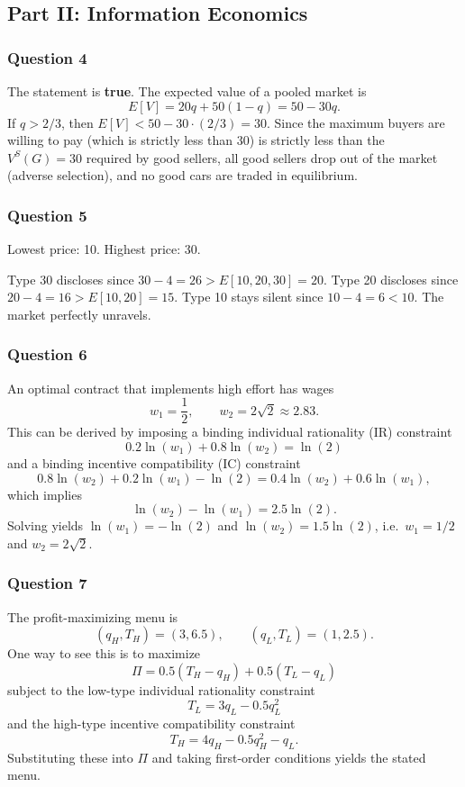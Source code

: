 \documentclass[12pt,a4paper]{article}
\begin{document}
\subsection*{Part II: Information Economics}

\subsubsection*{Question 4}

The statement is \textbf{true}. The expected value of a pooled market is
\[
  E[V] = 20q + 50(1-q) = 50 - 30q.
\]
If \(q > 2/3\), then \(E[V] < 50 - 30 \cdot (2/3) = 30\). Since the maximum buyers are willing to pay (which is strictly less than 30) is strictly less than the \(V^S(G) = 30\) required by good sellers, all good sellers drop out of the market (adverse selection), and no good cars are traded in equilibrium.

\subsubsection*{Question 5}

Lowest price: 10. Highest price: 30.

Type 30 discloses since \(30-4 = 26 > E[10,20,30]=20\). Type 20 discloses since \(20-4 = 16 > E[10,20]=15\). Type 10 stays silent since \(10-4=6 < 10\). The market perfectly unravels.

\subsubsection*{Question 6}

An optimal contract that implements high effort has wages
\[
  w_1 = \frac{1}{2}, \qquad w_2 = 2\sqrt{2} \approx 2.83.
\]
This can be derived by imposing a binding individual rationality (IR) constraint
\[
  0.2\ln(w_1) + 0.8\ln(w_2) = \ln(2)
\]
and a binding incentive compatibility (IC) constraint
\[
  0.8\ln(w_2) + 0.2\ln(w_1) - \ln(2)
  = 0.4\ln(w_2) + 0.6\ln(w_1),
\]
which implies
\[
  \ln(w_2) - \ln(w_1) = 2.5\ln(2).
\]
Solving yields \(\ln(w_1) = -\ln(2)\) and \(\ln(w_2) = 1.5\ln(2)\), i.e.\ \(w_1 = 1/2\) and \(w_2 = 2\sqrt{2}\).

\subsubsection*{Question 7}

The profit-maximizing menu is
\[
  (q_H, T_H) = (3, 6.5), \qquad (q_L, T_L) = (1, 2.5).
\]
One way to see this is to maximize
\[
  \Pi = 0.5(T_H - q_H) + 0.5(T_L - q_L)
\]
subject to the low-type individual rationality constraint
\[
  T_L = 3q_L - 0.5q_L^2
\]
and the high-type incentive compatibility constraint
\[
  T_H = 4q_H - 0.5q_H^2 - q_L.
\]
Substituting these into \(\Pi\) and taking first-order conditions yields the stated menu.
\end{document}
